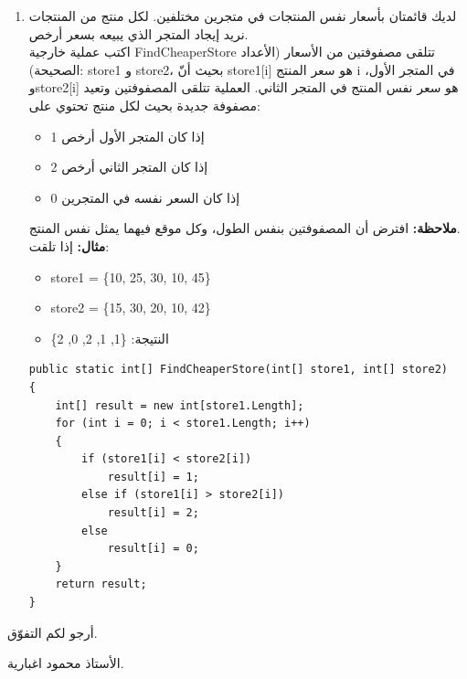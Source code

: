 \documentclass[14pt]{extarticle}
\begin{document}
\begin{enumerate}[itemsep=3em]
    \item
    لديك قائمتان بأسعار نفس المنتجات في متجرين مختلفين. لكل منتج من المنتجات نريد إيجاد المتجر الذي يبيعه بسعر أرخص.\\
    اكتب عملية خارجية \textenglish{FindCheaperStore} تتلقى مصفوفتين من الأسعار (الأعداد الصحيحة): \textenglish{store1} و \textenglish{store2}،
    بحيث أنّ \textenglish{store1[i]} هو سعر المنتج \textenglish{i} في المتجر الأول، و\textenglish{store2[i]} هو سعر نفس المنتج في المتجر الثاني.
    العملية تتلقى المصفوفتين وتعيد مصفوفة جديدة بحيث لكل منتج تحتوي على:
\begin{itemize}
    \item 1 إذا كان المتجر الأول أرخص
    \item 2 إذا كان المتجر الثاني أرخص
    \item 0 إذا كان السعر نفسه في المتجرين
\end{itemize}
    \textbf{ملاحظة:} افترض أن المصفوفتين بنفس الطول، وكل موقع فيهما يمثل نفس المنتج.\\
    \textbf{مثال:} إذا تلقت:
    \begin{itemize}
        \item \textenglish{store1 = \{10, 25, 30, 10, 45\}}
        \item \textenglish{store2 = \{15, 30, 20, 10, 42\}}
        \item النتيجة: \textenglish{\{1, 1, 2, 0, 2\}}
    \end{itemize}
    \ifwithsols
    \begin{boxSolution}
    \begin{english}
    \begin{verbatim}
public static int[] FindCheaperStore(int[] store1, int[] store2)
{
    int[] result = new int[store1.Length];
    for (int i = 0; i < store1.Length; i++)
    {
        if (store1[i] < store2[i])
            result[i] = 1;
        else if (store1[i] > store2[i])
            result[i] = 2;
        else
            result[i] = 0;
    }
    return result;
}
    \end{verbatim}
    \end{english}
    \end{boxSolution}
    \fi

\end{enumerate}

\vspace{2cm}
\begin{flushleft}
    أرجو لكم التفوّق.

    الأستاذ محمود اغبارية.
\end{flushleft}
\end{document}
